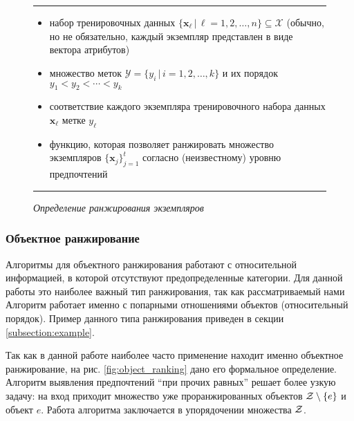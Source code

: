 		\begin{figure}[h]
			\hrule
			\begin{description}[nosep]
				\item[Дано:] \null\leavevmode
				\begin{itemize}[itemsep=0pt,leftmargin=2ex,label=\textbf{---}]
					\item набор тренировочных данных $\{\bm{x}_\ell \, | \, \ell = 1,2,\dots,n\} \subseteq \mathcal{X} $ (обычно, но не обязательно, каждый экземпляр представлен в виде вектора атрибутов)
					\item множество меток $\mathcal{Y} = \{y_i\,|\,i = 1,2,\dotsc,k\}$ и их порядок $y_1 < y_2 < \dotsb < y_k$ 
					\item соответствие каждого экземпляра тренировочного набора данных $\bm{x}_\ell$ метке $y_\ell$
				\end{itemize}
				\item[Найти:] \null\leavevmode
				\begin{itemize}[itemsep=0pt,leftmargin=2ex,label=\textbf{---}]
					\item функцию, которая позволяет ранжировать множество экземпляров $\{\bm{x}_j\}^t_{j=1}$ согласно (неизвестному) уровню предпочтений
				\end{itemize}
			\end{description} 
			\hrule
			\caption{\it Определение ранжирования экземпляров \cite[Рис.~2]{plbook:Introduction:2010}}
			\label{fig:instance_ranking}
		\end{figure}
	
	\subsubsection{Объектное ранжирование}
		Алгоритмы для объектного ранжирования работают с 
		относительной %
		информацией, в которой отсутствуют предопределенные категории. Для данной работы это наиболее важный тип ранжирования, так как рассматриваемый нами Алгоритм работает именно с попарными отношениями объектов (относительный порядок). Пример данного типа ранжирования приведен в секции \ref{subsection:example}.
		
		Так как в данной работе наиболее часто применение находит именно объектное ранжирование, на рис. \ref{fig:object_ranking} дано его формальное определение. Алгоритм выявления предпочтений \enquote{при прочих равных} решает более узкую задачу: на вход приходит множество уже проранжированных объектов $\mathcal{Z} \setminus \{e\}$ и объект $e$. Работа алгоритма заключается в упорядочении множества $\mathcal{Z}$.
		
